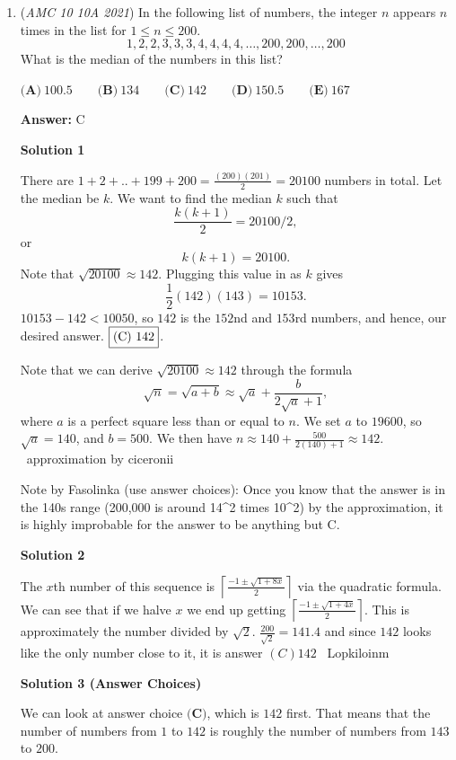 \begin{enumerate}
	\item (\textit{AMC 10 10A 2021}) In the following list of numbers, the integer $n$ appears $n$ times in the list for $1 \leq n \leq 200$.
 \[1, 2, 2, 3, 3, 3, 4, 4, 4, 4, \dots, 200, 200, \dots , 200\]What is the median of the numbers in this list?


 $\textbf{(A)} ~100.5\qquad\textbf{(B)} ~134\qquad\textbf{(C)} ~142\qquad\textbf{(D)} ~150.5\qquad\textbf{(E)} ~167$

 \textbf{Answer: }C



\textbf{Solution 1}

There are $1+2+..+199+200=\frac{(200)(201)}{2}=20100$ numbers in total. Let the median be $k$. We want to find the median $k$ such that
 \[\frac{k(k+1)}{2}=20100/2,\]or
 \[k(k+1)=20100.\]Note that $\sqrt{20100} \approx 142$. Plugging this value in as $k$ gives
 \[\frac{1}{2}(142)(143)=10153.\]$10153-142<10050$, so $142$ is the $152$nd and $153$rd numbers, and hence, our desired answer. $\fbox{(C) 142}$.

 Note that we can derive $\sqrt{20100} \approx 142$ through the formula 
 \[\sqrt{n} = \sqrt{a+b} \approx \sqrt{a} + \frac{b}{2\sqrt{a} + 1},\]where $a$ is a perfect square less than or equal to $n$. We set $a$ to $19600$, so $\sqrt{a} = 140$, and $b = 500$. We then have $n \approx 140 + \frac{500}{2(140)+1} \approx 142$. ~approximation by ciceronii

 Note by Fasolinka (use answer choices): Once you know that the answer is in the 140s range (200,000 is around 14\textasciicircum{}2 times 10\textasciicircum{}2) by the approximation, it is highly improbable for the answer to be anything but C.

 



\textbf{Solution 2}

The $x$th number of this sequence is $\left\lceil\frac{-1\pm\sqrt{1+8x}}{2}\right\rceil$ via the quadratic formula. We can see that if we halve $x$ we end up getting $\left\lceil\frac{-1\pm\sqrt{1+4x}}{2}\right\rceil$. This is approximately the number divided by $\sqrt{2}$. $\frac{200}{\sqrt{2}} = 141.4$ and since $142$ looks like the only number close to it, it is answer $\boxed{(C) 142}$ ~Lopkiloinm

 



\textbf{Solution 3 (Answer Choices)}

We can look at answer choice $\textbf{(C)}$, which is $142$ first. That means that the number of numbers from $1$ to $142$ is roughly the number of numbers from $143$ to $200$.


\end{enumerate}
